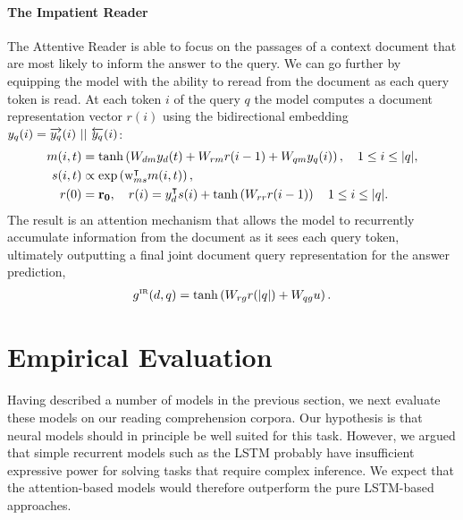 \documentclass{article}
\newcommand{\wtmat}[2]{W_{#1 #2}}
\begin{document}
\paragraph{The Impatient Reader}
The Attentive Reader is able to focus on the passages of a context document
that are most likely to inform the answer to the query. We can go further by
equipping the model with the ability to reread from the document as each query
token is read. At each token $i$ of the query $q$ the model computes a document
representation vector $r(i)$ using the bidirectional embedding $y_q(i) =
\overrightarrow{y_q}(i)\,\, ||\,\, \overleftarrow{y_q}(i)$:
\begin{align*}
  \attnIn(i, t)   &= \tanh\left(\wtmat{d}{\attnIn} \attnOver_d(t)
                   + \wtmat{\attnMix}{\attnIn} \attnMix(i-1)
                   + \wtmat{q}{\attnIn} y_q(i) \right)
                , \quad 1 \leq i \leq |q|,  \\
  \attnScore(i,t) &\propto \exp \left(\mathrm{w}_{\attnIn\attnScore}^\intercal
                   \attnIn(i,t) \right),\\
  \attnMix(0)     &= \mathbf{r_0}, \quad
                   \attnMix(i)     = \attnOver_d^\intercal \attnScore(i) +
                   \tanh\left(\wtmat{\attnMix}{\attnMix}\attnMix(i-1)\right)
  \quad 1 \leq i \leq |q|.
\end{align*}
The result is an attention mechanism that allows the model to recurrently
accumulate information from the document as it sees each query token, ultimately
outputting a final joint document query representation for the answer prediction,
\begin{align*}
  g^{\text{\tiny IR}}(d,q) = \tanh \left(\wtmat{\attnMix}{g} \attnMix(|q|) +
                             \wtmat{q}{g} \attnU \right).
\end{align*}
 \section{Empirical Evaluation}
\label{experiments}


Having described a number of models in the previous section, we next evaluate
these models on our reading comprehension corpora. Our hypothesis is that neural models should in principle be well suited for this
task. However, we argued that simple recurrent models such as the LSTM
probably have insufficient expressive power for solving tasks that require
complex inference. We expect that the attention-based models would therefore
outperform the pure LSTM-based approaches.
\end{document}
